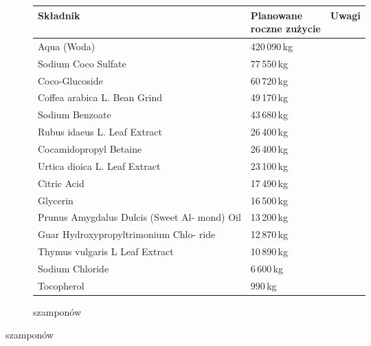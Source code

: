 {\renewcommand{\figurename}{\textbf{Tabela}}
\begin{figure}[H]
\centering
\caption{Planowane roczne zużycie surowców do produkcji:}
\begin{footnotesize}
	\begin{subfigure}{0.7\textwidth}
		\centering
		\caption{szamponów}
		\begin{tabular}{p{}ll}
			\hline
			\textbf{Składnik} & \makecell[l]{\textbf{Planowane} \\ \textbf{roczne zużycie}} & \textbf{Uwagi} \\
			\hline\hline
			Aqua (Woda) & 420\,090\,kg & \\
			Sodium Coco Sulfate & 77\,550\,kg & \\
			Coco-Glucoside & 60\,720\,kg & \\
			Coffea arabica L. Bean Grind & 49\,170\,kg & \\
			Sodium Benzoate & 43\,680\,kg & \\
			Rubus idaeus L. Leaf Extract & 26\,400\,kg & \\
			Cocamidopropyl Betaine & 26\,400\,kg & \\
			Urtica dioica L. Leaf Extract & 23\,100\,kg & \\
			Citric Acid & 17\,490\,kg & \\
			Glycerin & 16\,500\,kg & \\
			Prunus Amygdalus Dulcis (Sweet Al- mond) Oil & 13\,200\,kg & \\
			Guar Hydroxypropyltrimonium Chlo- ride & 12\,870\,kg & \\
			Thymus vulgaris L Leaf Extract & 10\,890\,kg & \\
			Sodium Chloride & 6\,600\,kg & \\
			Tocopherol & 990\,kg & \\
			\hline
		\end{tabular}
	\end{subfigure}


\end{footnotesize}
\end{figure}}

